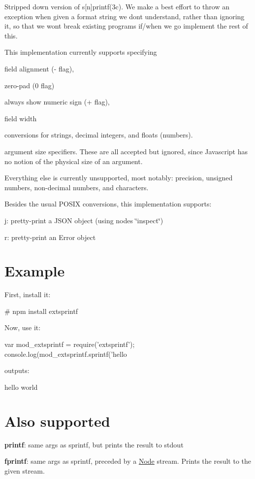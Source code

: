 Stripped down version of s\mbox{[}n\mbox{]}printf(3c). We make a best effort to throw an exception when given a format string we don\textquotesingle{}t understand, rather than ignoring it, so that we won\textquotesingle{}t break existing programs if/when we go implement the rest of this.

This implementation currently supports specifying


\begin{DoxyItemize}
\item field alignment (\textquotesingle{}-\/\textquotesingle{} flag),
\item zero-\/pad (\textquotesingle{}0\textquotesingle{} flag)
\item always show numeric sign (\textquotesingle{}+\textquotesingle{} flag),
\item field width
\item conversions for strings, decimal integers, and floats (numbers).
\item argument size specifiers. These are all accepted but ignored, since Javascript has no notion of the physical size of an argument.
\end{DoxyItemize}

Everything else is currently unsupported, most notably\+: precision, unsigned numbers, non-\/decimal numbers, and characters.

Besides the usual P\+O\+S\+IX conversions, this implementation supports\+:


\begin{DoxyItemize}
\item {\ttfamily j}\+: pretty-\/print a J\+S\+ON object (using node\textquotesingle{}s \char`\"{}inspect\char`\"{})
\item {\ttfamily r}\+: pretty-\/print an Error object
\end{DoxyItemize}

\section*{Example}

First, install it\+: \begin{DoxyVerb}# npm install extsprintf
\end{DoxyVerb}


Now, use it\+: \begin{DoxyVerb}var mod_extsprintf = require('extsprintf');
console.log(mod_extsprintf.sprintf('hello %
\end{DoxyVerb}


outputs\+: \begin{DoxyVerb}hello                     world
\end{DoxyVerb}


\section*{Also supported}

{\bfseries printf}\+: same args as sprintf, but prints the result to stdout

{\bfseries fprintf}\+: same args as sprintf, preceded by a \mbox{\hyperlink{classNode}{Node}} stream. Prints the result to the given stream. 